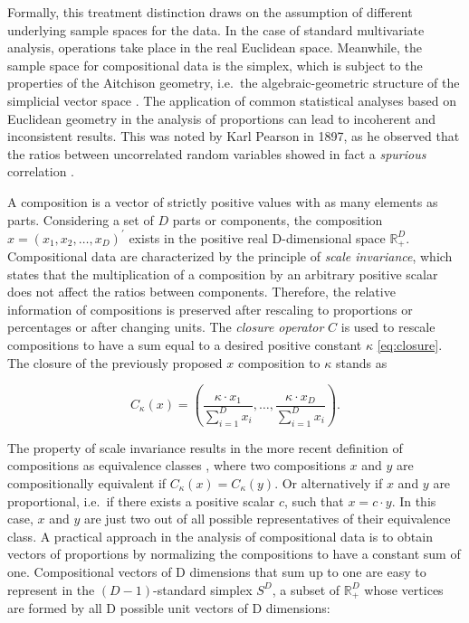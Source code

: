 \documentclass[
  openany]{book}
\begin{document}
Formally, this treatment distinction draws on the assumption of different underlying sample spaces for the data. In the case of standard multivariate analysis, operations take place in the real Euclidean space. Meanwhile, the sample space for compositional data is the simplex, which is subject to the properties of the Aitchison geometry, i.e.~the algebraic-geometric structure of the simplicial vector space \autocite{Aitchison1982}. The application of common statistical analyses based on Euclidean geometry in the analysis of proportions can lead to incoherent and inconsistent results. This was noted by Karl Pearson in 1897, as he observed that the ratios between uncorrelated random variables showed in fact a \emph{spurious} correlation \autocite{Pearson1897}.

A composition is a vector of strictly positive values with as many elements as parts. Considering a set of \(D\) parts or components, the composition \(x = (x_1, x_2, \ldots, x_D)^\prime\) exists in the positive real D-dimensional space \(\mathbb{R}^D_+\). Compositional data are characterized by the principle of \emph{scale invariance}, which states that the multiplication of a composition by an arbitrary positive scalar does not affect the ratios between components. Therefore, the relative information of compositions is preserved after rescaling to proportions or percentages or after changing units. The \emph{closure operator} \(C\) is used to rescale compositions to have a sum equal to a desired positive constant \(\kappa\) \eqref{eq:closure}. The closure of the previously proposed \(x\) composition to \(\kappa\) stands as

\begin{equation} 
  C_{\kappa}(x) = \left( \frac{\kappa \cdot x_1}{\sum^{D}_{i=1}x_i}, \ldots, \frac{\kappa \cdot x_D}{\sum^{D}_{i=1}x_i} \right).
  \label{eq:closure}
\end{equation}

The property of scale invariance results in the more recent definition of compositions as equivalence classes \autocite{Barcelo-Vidal2016}, where two compositions \(x\) and \(y\) are compositionally equivalent if \(C_{\kappa}(x) = C_{\kappa}(y)\). Or alternatively if \(x\) and \(y\) are proportional, i.e.~if there exists a positive scalar \(c\), such that \(x = c \cdot y\). In this case, \(x\) and \(y\) are just two out of all possible representatives of their equivalence class. A practical approach in the analysis of compositional data is to obtain vectors of proportions by normalizing the compositions to have a constant sum of one. Compositional vectors of D dimensions that sum up to one are easy to represent in the \((D-1)\)-standard simplex \(S^D\), a subset of \(\mathbb{R}^D_+\) whose vertices are formed by all D possible unit vectors of D dimensions:
\end{document}
